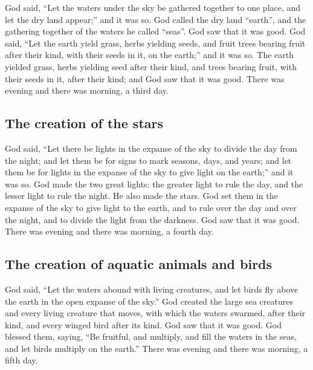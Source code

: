  God said, ``Let the waters under the sky be gathered
together to one place, and let the dry land appear;'' and it was so.
 God called the dry land ``earth'', and the gathering
together of the waters he called ``seas''. God saw that it was good.
 God said, ``Let the earth yield grass, herbs yielding
seeds, and fruit trees bearing fruit after their kind, with their seeds
in it, on the earth;'' and it was so.  The earth yielded
grass, herbs yielding seed after their kind, and trees bearing fruit,
with their seeds in it, after their kind; and God saw that it was good.
 There was evening and there was morning, a third day.

\hypertarget{the-creation-of-the-stars}{%
\subsection{The creation of the stars}\label{the-creation-of-the-stars}}

 God said, ``Let there be lights in the expanse of the
sky to divide the day from the night; and let them be for signs to mark
seasons, days, and years;  and let them be for lights in
the expanse of the sky to give light on the earth;'' and it was so.
 God made the two great lights: the greater light to rule
the day, and the lesser light to rule the night. He also made the stars.
 God set them in the expanse of the sky to give light to
the earth,  and to rule over the day and over the night,
and to divide the light from the darkness. God saw that it was good.
 There was evening and there was morning, a fourth day.

\hypertarget{the-creation-of-aquatic-animals-and-birds}{%
\subsection{The creation of aquatic animals and
birds}\label{the-creation-of-aquatic-animals-and-birds}}

 God said, ``Let the waters abound with living creatures,
and let birds fly above the earth in the open expanse of the sky.''
 God created the large sea creatures and every living
creature that moves, with which the waters swarmed, after their kind,
and every winged bird after its kind. God saw that it was good.
 God blessed them, saying, ``Be fruitful, and multiply,
and fill the waters in the seas, and let birds multiply on the earth.''
 There was evening and there was morning, a fifth day.

